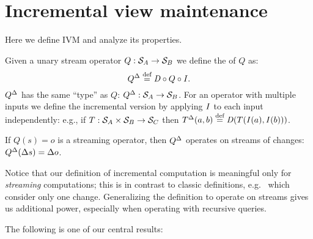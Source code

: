 \section{Incremental view maintenance}\label{sec:incremental}

Here we define IVM and analyze its properties.

\begin{definition}
Given a unary stream operator $Q: \mathcal{S}_{A} \to \mathcal{S}_{B}$ we define the
 of $Q$ as:
\begin{equation}\label{def:inc}
{Q}^{\Delta} \stackrel{\textrm{\scriptsize def}}{=} \mathit{D} \circ Q \circ \mathit{I}.
\end{equation}
${Q}^{\Delta}$ has the same ``type'' as $Q$: ${Q}^{\Delta}: \mathcal{S}_{A} \to \mathcal{S}_{B}$.
For an operator with multiple inputs we define
the incremental version by applying $\mathit{I}$ to each input independently:
e.g., if $T: \mathcal{S}_{A} \times \mathcal{S}_{B} \rightarrow \mathcal{S}_{C}$ then
${T}^{\Delta}(a, b) \stackrel{\textrm{\scriptsize def}}{=} \mathit{D} (T(\mathit{I}(a), \mathit{I}(b)))$.
\end{definition}

\begin{center}
\end{center}
If $Q(s) = o$ is a streaming operator, then ${Q}^{\Delta}$ operates on
streams of changes: ${Q}^{\Delta}(\Delta s) = \Delta o$.

Notice that our definition of incremental computation is meaningful only for \emph{streaming}
computations; this is in contrast to classic definitions, e.g.~\cite{gupta-idb95} which
consider only one change.  Generalizing the definition to operate on streams gives us
additional power, especially when operating with recursive queries.

The following is one of our central results:


